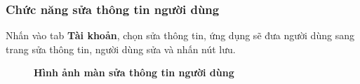 \subsubsection{Chức năng sửa thông tin người dùng}
Nhấn vào tab \textbf{Tài khoản}, chọn sửa thông tin, ứng dụng sẽ đưa người dùng sang trang sửa thông tin, người dùng sửa và nhấn nút lưu.
\begin{figure}[H]
  \centering
  \hfill
  \caption[Hình ảnh màn sửa thông tin người dùng]{\bfseries \fontsize{12pt}{0pt}
  \selectfont Hình ảnh màn sửa thông tin người dùng}
  \label{user_info_edit_waznet}
\end{figure}
